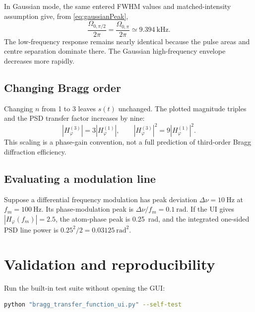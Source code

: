 \documentclass[11pt,a4paper]{article}
\newcommand{\Hphi}{H_{\varphi}}
\begin{document}
In Gaussian mode, the same entered FWHM values and matched-intensity assumption give, from \cref{eq:gaussianPeak},
\begin{equation}
\frac{\Omega_{0,\pi/2}}{2\pi}
=\frac{\Omega_{0,\pi}}{2\pi}
\simeq\SI{9.394}{\kilo\hertz}.
\end{equation}
The low-frequency response remains nearly identical because the pulse areas and centre separation dominate there. The Gaussian high-frequency envelope decreases more rapidly.

\subsection{Changing Bragg order}

Changing $n$ from 1 to 3 leaves $s(t)$ unchanged. The plotted magnitude triples and the PSD transfer factor increases by nine:
\begin{equation}
|\Hphi^{(3)}|=3|\Hphi^{(1)}|,
\qquad
|\Hphi^{(3)}|^2=9|\Hphi^{(1)}|^2.
\end{equation}
This scaling is a phase-gain convention, not a full prediction of third-order Bragg diffraction efficiency.

\subsection{Evaluating a modulation line}

Suppose a differential frequency modulation has peak deviation $\Delta\nu=\SI{10}{\hertz}$ at $f_m=\SI{100}{\hertz}$. Its phase-modulation peak is $\Delta\nu/f_m=\SI{0.1}{\radian}$. If the UI gives $|\Hphi(f_m)|=2.5$, the atom-phase peak is \SI{0.25}{\radian}, and the integrated one-sided PSD line power is $0.25^2/2=\SI{0.03125}{\radian\squared}$.

\section{Validation and reproducibility}

Run the built-in test suite without opening the GUI:
\begin{lstlisting}[language=bash]
python "bragg_transfer_function_ui.py" --self-test
\end{lstlisting}
\end{document}
